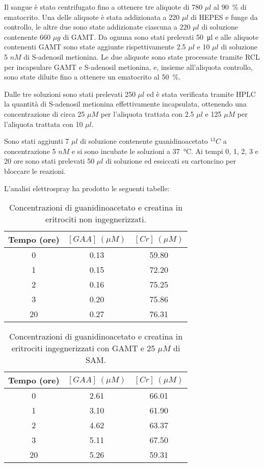 		Il sangue \`e stato centrifugato fino a ottenere tre aliquote di 780 $\mu l$ al \SI{90}{\percent} di ematocrito.
		Una delle aliquote \`e stata addizionata a 220 $\mu l$ di HEPES e funge da controllo, le altre due sono state addizionate ciascuna a 220 $\mu l$ di soluzione contenente 660 $\mu g$ di GAMT.
		Da ognuna sono stati prelevati \SI{50}{\micro l} e alle aliquote contenenti GAMT sono state aggiunte rispettivamente 2.5 $\mu l$ e 10 $\mu l$ di soluzione 5 $nM$ di S-adenosil metionina.
		Le due aliquote sono state processate tramite RCL per incapsulare GAMT e S-adenosil metionina, e, insieme all'aliquota controllo, sono state diluite fino a ottenere un ematocrito al \SI{50}{\percent}.
		
		Dalle tre soluzioni sono stati prelevati 250 $\mu l$ ed \`e stata verificata tramite HPLC la quantit\`a di S-adenosil metionina effettivamente incapsulata, ottenendo una concentrazione di circa 25 $\mu M$ per l'aliquota trattata con 2.5 $\mu l$ e 125 $\mu M$ per l'aliquota trattata con 10 $\mu l$.
		
		Sono stati aggiunti 7 $\mu l$ di soluzione contenente guanidinoacetato $^{13}C$ a concentrazione 5 $nM$ e si sono incubate le soluzioni a \SI{37}{\celsius}.
		Ai tempi 0, 1, 2, 3 e 20 ore sono stati prelevati 50 $\mu l$ di soluzione ed essiccati su cartoncino per bloccare le reazioni.
		
		L'analisi elettrospray ha prodotto le seguenti tabelle:
	\begin{table}[H]
		\centering
		\begin{tabular}{| c | c | c |}
			\hline
			Tempo (ore) & $[GAA]\ (\mu M)$ & $[Cr]\ (\mu M)$ \\
			\hline
			0 & 0.13 & 59.80\\
			\hline
			1 & 0.15 & 72.20\\
			\hline
			2 & 0.16 & 75.25\\
			\hline
			3 & 0.20 & 75.86\\
			\hline
			20 & 0.27 & 76.31\\
			\hline
		\end{tabular}
		\caption{Concentrazioni di guanidinoacetato e creatina in eritrociti non ingegnerizzati.}
		\label{tab:unloaded}
	\end{table}
	
	\begin{table}[H]
		\centering
		\begin{tabular}{| c | c | c |}
			\hline
			Tempo (ore) & $[GAA]\ (\mu M)$ & $[Cr]\ (\mu M)$ \\
			\hline
			0 & 2.61 & 66.01\\
			\hline
			1 & 3.10 & 61.90\\
			\hline
			2 & 4.62 & 63.37\\
			\hline
			3 & 5.11 & 67.50\\
			\hline
			20 & 5.26 & 59.31\\
			\hline
		\end{tabular}
		\caption{Concentrazioni di guanidinoacetato e creatina in eritrociti ingegnerizzati con GAMT e 25 $\mu M$ di SAM.}
		\label{tab:25um}
	\end{table}
	
